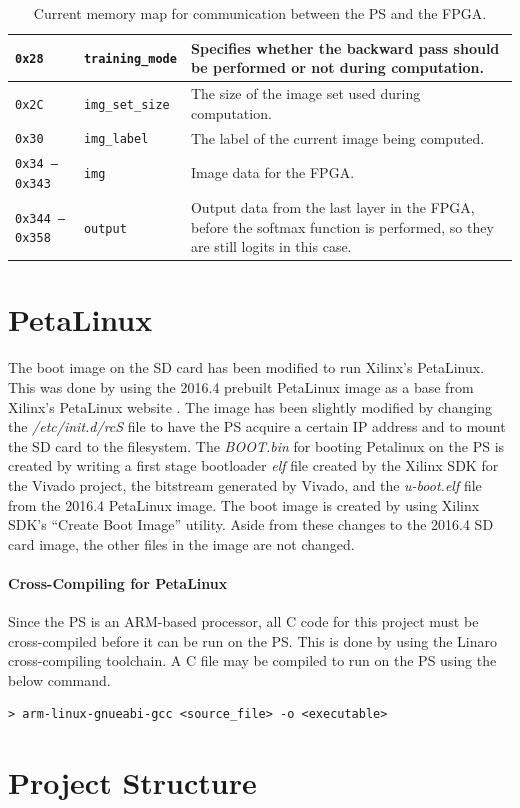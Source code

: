 \begin{table}
\begin{tabularx}{\textwidth}{|l| l| X|}
		\texttt{0x28} &
		\texttt{training\_mode} &
		Specifies whether the backward pass should be performed or not during computation.\\\hline
		
		\texttt{0x2C} &
		\texttt{img\_set\_size} &
		The size of the image set used during computation. \\\hline 
		
		\texttt{0x30} &
		\texttt{img\_label} &
		The label of the current image being computed. \\\hline 
		
		\texttt{0x34 -- 0x343} &
		\texttt{img} &
		Image data for the FPGA. \\\hline
		
		\texttt{0x344 -- 0x358} &
		\texttt{output} &
		Output data from the last layer in the FPGA, before the softmax function is performed, so they are still logits in this case.\\\hline		
	\end{tabularx}	
	\caption{Current memory map for communication between the PS and the FPGA.}
	\label{tbl:mmio}
\end{table}

\section{PetaLinux}
The boot image on the SD card has been modified to run Xilinx's PetaLinux. This was done by using the 2016.4 prebuilt PetaLinux image as a base from Xilinx's PetaLinux website \cite{petalinux}. The image has been slightly modified by changing the \textit{/etc/init.d/rcS} file to have the PS acquire a certain IP address and to mount the SD card to the filesystem. The \textit{BOOT.bin} for booting Petalinux on the PS is created by writing a first stage bootloader \textit{elf} file created by the Xilinx SDK for the Vivado project, the bitstream generated by Vivado, and the \textit{u-boot.elf} file from the 2016.4 PetaLinux image. The boot image is created by using Xilinx SDK's ``Create Boot Image'' utility. Aside from these changes to the 2016.4 SD card image, the other files in the image are not changed.

\paragraph{Cross-Compiling for PetaLinux}
Since the PS is an ARM-based processor, all C code for this project must be cross-compiled before it can be run on the PS. This is done by using the Linaro cross-compiling toolchain. A C file may be compiled to run on the PS using the below command.
\begin{lstlisting}
> arm-linux-gnueabi-gcc <source_file> -o <executable>
\end{lstlisting}

\section{Project Structure}
